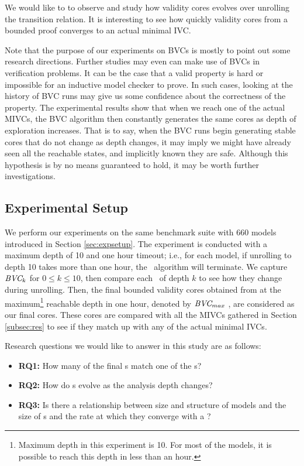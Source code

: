 We would like to to observe and study how validity cores evolves over unrolling the transition relation. It is interesting to see how quickly validity cores from a bounded proof converges to an actual minimal IVC.

Note that the purpose of our experiments on BVCs is mostly to point out some research directions. Further studies may even can make use of BVCs in verification problems. It can be the case that a valid property is hard or impossible for an inductive model checker to prove. In such cases, looking at the history of BVC runs may give us some confidence about the correctness of the property. The experimental results show that when we reach one of the actual MIVCs, the BVC algorithm then constantly generates the same cores as depth of exploration increases. That is to say, when the BVC runs begin generating stable cores that do not change as depth changes, it may imply we might have already seen all the reachable states, and implicitly known they are safe. Although this hypothesis is by no means guaranteed to hold, it may be worth further investigations.

\subsection{Experimental Setup}
  We perform our experiments on the same benchmark suite with 660 models introduced in Section \ref{sec:expsetup}. The experiment is conducted with a maximum depth of 10 and one hour timeout; i.e., for each model, if unrolling to depth 10 takes more than one hour, the \bvcalg\ algorithm will terminate. We capture $\textit{BVC} _{k}$ for $ 0 \leq k \le 10$, then compare each \bvc\ of depth $k$ to see how they change during unrolling. Then, the final bounded validity cores obtained from at the maximum\footnote{Maximum depth in this experiment is 10. For most of the models, it is possible to reach this depth in less than an hour.}
  reachable depth in one hour, denoted by $\textit{BVC} _{max}$ , are considered as our final cores. These cores are compared with all the MIVCs gathered in Section \ref{subsec:res} to see if they match up with any of the actual minimal IVCs.

Research questions we would like to answer in this study are as follows:
\begin{itemize}
  \item \textbf{RQ1:} How many of the final \bvc s match one of the \mivc s?
  \item \textbf{RQ2:} How do \bvc s evolve as the analysis depth changes?
  \item \textbf{RQ3:} Is there a relationship between size and structure of models and the size of \bvc s and the rate at which they converge with a \mivc?
\end{itemize}

